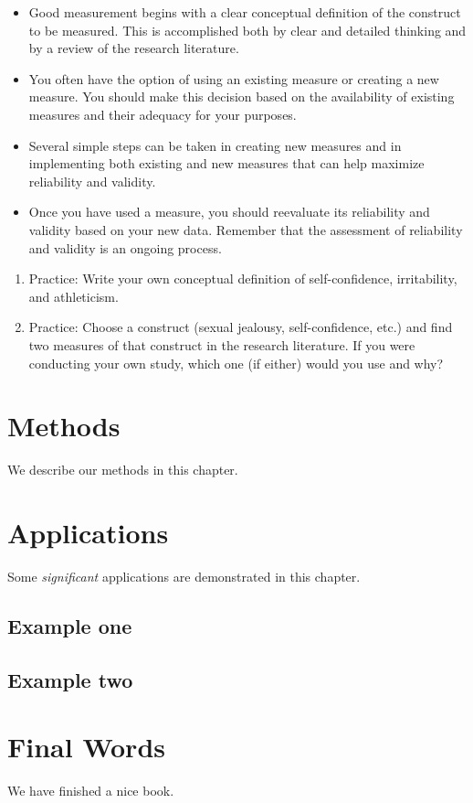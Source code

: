 \documentclass[]{book}
\theoremstyle{definition}
\theoremstyle{definition}
\theoremstyle{remark}
\begin{document}
\begin{itemize}
\item
  Good measurement begins with a clear conceptual definition of the
  construct to be measured. This is accomplished both by clear and
  detailed thinking and by a review of the research literature.
\item
  You often have the option of using an existing measure or creating a
  new measure. You should make this decision based on the availability
  of existing measures and their adequacy for your purposes.
\item
  Several simple steps can be taken in creating new measures and in
  implementing both existing and new measures that can help maximize
  reliability and validity.
\item
  Once you have used a measure, you should reevaluate its reliability
  and validity based on your new data. Remember that the assessment of
  reliability and validity is an ongoing process.
\end{itemize}

\begin{enumerate}
\def\labelenumi{\arabic{enumi}.}
\item
  Practice: Write your own conceptual definition of self-confidence,
  irritability, and athleticism.
\item
  Practice: Choose a construct (sexual jealousy, self-confidence, etc.)
  and find two measures of that construct in the research literature. If
  you were conducting your own study, which one (if either) would you
  use and why?
\end{enumerate}

\chapter{Methods}\label{methods}

We describe our methods in this chapter.

\chapter{Applications}\label{applications}

Some \emph{significant} applications are demonstrated in this chapter.

\section{Example one}\label{example-one}

\section{Example two}\label{example-two}

\chapter{Final Words}\label{final-words}

We have finished a nice book.


\end{document}
